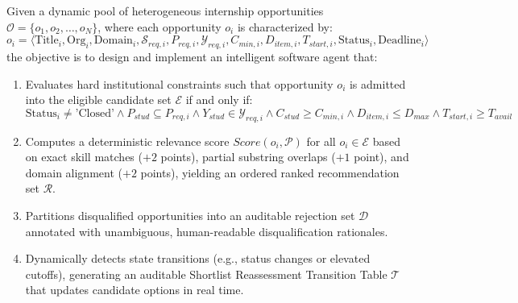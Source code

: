 Given a dynamic pool of heterogeneous internship opportunities $\mathcal{O} = \{o_1, o_2, \dots, o_N\}$, where each opportunity $o_i$ is characterized by:
\begin{equation}
	o_i = \langle \text{Title}_i, \text{Org}_i, \text{Domain}_i, \mathcal{S}_{req,i}, P_{req,i}, \mathcal{Y}_{req,i}, C_{min,i}, D_{item,i}, T_{start,i}, \text{Status}_i, \text{Deadline}_i \rangle \label{e1.2}
\end{equation}
the objective is to design and implement an intelligent software agent that:
\begin{enumerate}[label=\textbf{\roman*)}]
	\item Evaluates hard institutional constraints such that opportunity $o_i$ is admitted into the eligible candidate set $\mathcal{E}$ if and only if:
	\begin{equation}
		\text{Status}_i \ne \text{'Closed'} \land P_{stud} \subseteq P_{req,i} \land Y_{stud} \in \mathcal{Y}_{req,i} \land C_{stud} \ge C_{min,i} \land D_{item,i} \le D_{max} \land T_{start,i} \ge T_{avail} \label{e1.3}
	\end{equation}
	\item Computes a deterministic relevance score $Score(o_i, \mathcal{P})$ for all $o_i \in \mathcal{E}$ based on exact skill matches ($+2$ points), partial substring overlaps ($+1$ point), and domain alignment ($+2$ points), yielding an ordered ranked recommendation set $\mathcal{R}$.
	\item Partitions disqualified opportunities into an auditable rejection set $\mathcal{D}$ annotated with unambiguous, human-readable disqualification rationales.
	\item Dynamically detects state transitions (e.g., status changes or elevated cutoffs), generating an auditable Shortlist Reassessment Transition Table $\mathcal{T}$ that updates candidate options in real time.
\end{enumerate}

